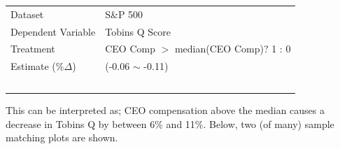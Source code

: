 \documentclass[final]{beamer}
\newlength{\onecolwid}
\begin{document}
\begin{frame}[t]
\begin{columns}[t]
\begin{column}{\onecolwid}
\begin{block}{}
         \setlength{\tabcolsep}{0.6em}
         {\renewcommand{\arraystretch}{1}%
         \begin{tabular}{ll}
	{\large \color{black}  Dataset} & {\large \color{black} S\&P 500 } \\
	{\large \color{black} Dependent Variable} & {\large \color{black} Tobins Q Score } \\
	{\large \color{black} Treatment} & {\color{black} CEO Comp $>$ median(CEO Comp)? 1 : 0}  \\
	{\large \color{black} Estimate ($\% \Delta $)} & {\large \color{black} (-0.06 $\sim$ -0.11)} \\~\\
	\end{tabular}  }
	 {\large \color{black} This can be interpreted as; CEO compensation above the median causes a decrease in Tobins Q by between 6\% and 11\%. Below, two (of many) sample matching plots are shown.  }\\~\\


\end{block}
\end{column}
\end{columns}
\end{frame}
\end{document}

